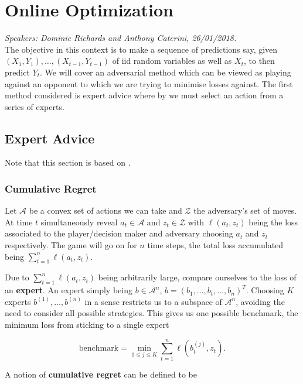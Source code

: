 
\chapter{Online Optimization}
\emph{Speakers: Dominic Richards and Anthony Caterini, 26/01/2018.}\\

The objective in this context is to make a sequence of predictions say, given $(X_1,Y_1),\dots,(X_{t-1},Y_{t-1})$ of iid random variables as well as $X_t$, to then predict $Y_t$. We will cover an adversarial method which can be viewed as playing against an opponent to which we are trying to minimise losses against.  The first method considered is expert advice where by we must select an action from a series of experts. 

\section{Expert Advice}

Note that this section is based on \cite[Lecture~15]{rigollet}.

\subsection{Cumulative Regret}

Let $\mathcal{A}$ be a convex set of actions we can take and $\mathcal{Z}$ the adversary's set of moves. At time $t$ simultaneously reveal $a_t \in \mathcal{A}$ and $z_t \in \mathcal{Z}$ with $\ell(a_t,z_t)$  being the loss associated to the player/decision maker and adversary choosing $a_t$ and $z_t$ respectively. The game will go on for $n$ time steps, the total loss accumulated being $\sum_{t=1}^{n} \ell(a_t,z_t)$.

Due to $\sum_{t=1}^{n} \ell(a_t,z_t)$ being arbitrarily large, compare ourselves to the loss of an \textbf{expert}. An expert simply being $b \in \mathcal{A}^n$, $b=(b_1,\dots,b_t,\dots,b_n)^T$. Choosing $K$ experts $b^{(1)},\dots,b^{(n)}$ in a sense restricts us to a subspace of $\mathcal{A}^n$, avoiding the need to consider all possible strategies. This gives us one possible benchmark, the minimum loss from sticking to a single expert 

$$
	\text{benchmark} = \min_{1 \leq j \leq K} \sum_{t=1}^n \ell(b_t^{(j)},z_t). 
$$

A notion of \textbf{cumulative regret} can be defined to be 

